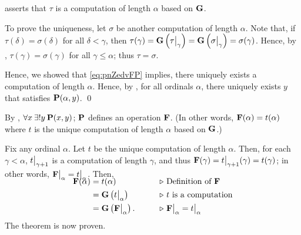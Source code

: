 \documentclass[../introduction_to_set_theory_Note.tex]{subfiles}
\begin{document}
{{        

        \noindent
         asserts that \(\tau\) is a computation
        of length \(\alpha\) based on \(\bm{\mathrm{G}}\).

        To prove the uniqueness, let \(\sigma\) be another computation of length \(\alpha\).
        Note that, if \(\tau(\delta) = \sigma(\delta)\) for all \(\delta < \gamma\),
        then \(\tau(\gamma) = \mbf{G}\left(\restr{\tau}{\gamma}\right)
        = \mbf{G}\left(\restr{\sigma}{\gamma}\right) = \sigma(\gamma)\).
        Hence, by ,
        \(\tau(\gamma) = \sigma(\gamma)\) for all \(\gamma \le \alpha\);
        thus \(\tau = \sigma\).

        Hence, we showed that \eqref{eq:pnZedvFP}
        implies, there uniquely exists a computation of length \(\alpha\).
        Hence, by ,
        for all ordinals \(\alpha\), there uniquely exists \(y\)
        that satisfies \(\bm{\mathrm{P}}(\alpha, y)\). \qed
    }

    By , \(\forall x\:\exists! y\: \bm{\mathrm{P}}(x, y)\);
    \(\bm{\mathrm{P}}\) defines an operation \(\bm{\mathrm{F}}\).
    (In other words, \(\bm{\mathrm{F}}(\alpha) = t(\alpha)\) where \(t\)
    is the unique computation of length \(\alpha\) based on \(\bm{\mathrm{G}}\).)

    Fix any ordinal \(\alpha\).
    Let \(t\) be the unique computation of length \(\alpha\).
    Then, for each \(\gamma < \alpha\), \(\restr{t}{\gamma + 1}\)
    is a computation of length \(\gamma\),
    and thus \(\mbf{F}(\gamma) = \restr{t}{\gamma + 1}(\gamma) = t(\gamma)\);
    in other words, \(\restr{\mbf{F}}{\alpha} = \restr{t}{\alpha}\).
    Then,
    \begin{alignat*}{2}\SwapAboveDisplaySkip
        \mbf{F}(\alpha)
        &= t(\alpha) &\qquad& \comment*{Definition of \(\mbf{F}\)} \\
        &= \mbf{G}\left(\restr{t}{\alpha}\right) && \comment*{\(t\) is a computation} \\
        &= \mbf{G}\left(\restr{\mbf{F}}{\alpha}\right). && \comment*{\(\restr{\mbf{F}}{\alpha} = \restr{t}{\alpha}\)}
    \end{alignat*}
    The theorem is now proven.
}
\end{document}
